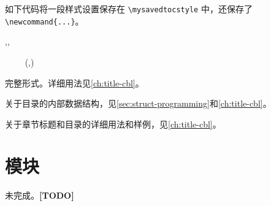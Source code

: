 \documentclass[twoside]{book}
\newcommand*{\TODO}{\textcolor{red!90!black}{\bfseries[TODO]}}
\begin{document}
如下代码将一段样式设置保存在 \verb|\mysavedtocstyle| 中，还保存了 \\
\verb|\newcommand{...}|。
\begin{xample}
\SaveSpecifiedCombinedListStyle {}
\stopxamplecode
\xamplecode\medskip
\end{xample}

\begin{function}{\SetSpecifiedCombinedListStyle,\SpecifiedCombinedList,
  \LocalSpecifiedCombinedList}
  \begin{syntax}
    \V\SetSpecifiedCombinedListStyle {} 
    ~~~~    
    \V\SpecifiedCombinedList {}
    \V\LocalSpecifiedCombinedList {}
    \V\LocalSpecifiedCombinedList {} \string(,\string)
  \end{syntax}
完整形式。详细用法见\cref{ch:title-cbl}。
\end{function}

关于目录的内部数据结构，见\cref{sec:struct-programming}和\cref{ch:title-cbl}。

关于章节标题和目录的详细用法和样例，见\cref{ch:title-cbl}。

\section{模块}
未完成。\TODO 



\end{document}
